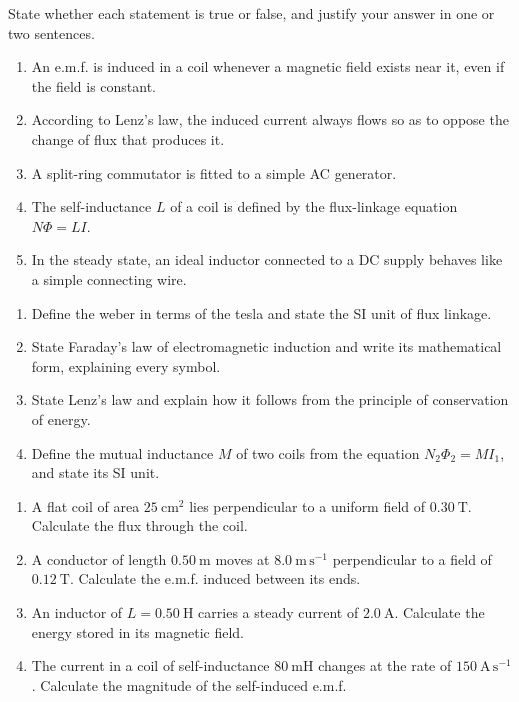 \documentclass[11pt]{article}
\newcommand{\cle}[1]{{\popxbold\color{popdark}#1}}
\begin{document}
\begin{exercice}
State whether each statement is true or false, and justify your answer in one or two sentences.
\begin{enumerate}
\item An e.m.f. is induced in a coil whenever a magnetic field exists near it, even if the field is constant.
\item According to Lenz's law, the induced current always flows so as to oppose the change of flux that produces it.
\item A split-ring commutator is fitted to a simple AC generator.
\item The self-inductance $L$ of a coil is defined by the flux-linkage equation $N\Phi = LI$.
\item In the steady state, an ideal inductor connected to a DC supply behaves like a simple connecting wire.
\end{enumerate}
\end{exercice}

\begin{exercice}
\begin{enumerate}
\item Define the \cle{weber} in terms of the tesla and state the SI unit of flux linkage.
\item State Faraday's law of electromagnetic induction and write its mathematical form, explaining every symbol.
\item State Lenz's law and explain how it follows from the principle of conservation of energy.
\item Define the \cle{mutual inductance} $M$ of two coils from the equation $N_2\Phi_2 = MI_1$, and state its SI unit.
\end{enumerate}
\end{exercice}

\begin{exercice}
\begin{enumerate}
\item A flat coil of area $25\ \mathrm{cm^2}$ lies perpendicular to a uniform field of $0.30\ \mathrm{T}$. Calculate the flux through the coil.
\item A conductor of length $0.50\ \mathrm{m}$ moves at $8.0\ \mathrm{m\,s^{-1}}$ perpendicular to a field of $0.12\ \mathrm{T}$. Calculate the e.m.f. induced between its ends.
\item An inductor of $L = 0.50\ \mathrm{H}$ carries a steady current of $2.0\ \mathrm{A}$. Calculate the energy stored in its magnetic field.
\item The current in a coil of self-inductance $80\ \mathrm{mH}$ changes at the rate of $150\ \mathrm{A\,s^{-1}}$. Calculate the magnitude of the self-induced e.m.f.
\end{enumerate}
\end{exercice}
\end{document}
